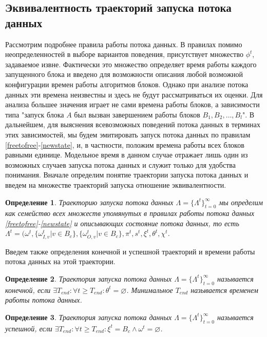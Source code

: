 \documentclass[10pt,a4paper]{article}
\newtheorem{defen}{Определение}
\begin{document}
\subsection{Эквивалентность траекторий запуска потока данных}
  Рассмотрим подробнее правила работы потока данных. В правилах помимо неопределенностей в выборе вариантов поведения, присутствует множество $\phi^t$, задаваемое извне.
  Фактически это множество определяет время работы каждого запущенного блока и введено для возможности описания любой возможной конфигурации времен работы алгоритмов блоков.
  Однако при анализе потока данных эти времена неизвестны и здесь не будут рассматриваться их оценки. Для анализа большее значения играет не сами времена работы блоков, а
  зависимости типа "запуск блока $A$ был вызван завершением работы блоков $B_1, B_2, \dots, B_l$".
  В дальнейшем, для выяснения всевозможных поведений потока данных в терминах этих зависимостей,
  мы будем эмитировать запуск потока данных по правилам \eqref{freetofree}-\eqref{newstate}, и, в частности, положим времена работы всех блоков равными единице.
  Модельное время в данном случае отражает лишь один из возможных случаев запуска потока данных и служит только для удобства понимания.
  Вначале определим понятие траектории запуска потока данных и введем на множестве траекторий запуска отношение эквивалентности.
  
  \begin{defen}
    Траекторию запуска потока данных $\Lambda = \{\Lambda^t\}_{t=0}^{\infty}$ мы определим как семейство всех множеств упомянутых в
    правилах работы потока данных \eqref{freetofree}-\eqref{newstate} и описывающих состояние потока данных,
    то есть $\Lambda^t = (\omega^t, \{\omega^t_{I, v} \vert v \in B_c\}, \{\omega^t_{O, v} \vert v \in B_c\}, \pi^t, s^t, \xi^t, \theta^t, \chi^t$.
  \end{defen}
  
  Введем также определения конечной и успешной траекторий и времени работы потока данных на этой траектории.
  \begin{defen}
    Траектория запуска потока данных $\Lambda = \{\Lambda^t\}_{t=0}^{\infty}$ называется конечной, если
    $\exists T_{end}: \forall t \geq T_{end}: \theta^t = \varnothing$. Минимальное $T_{end}$ называется временем работы потока данных.
    \label{def:trajectory_finite}
  \end{defen}
  
  \begin{defen}
    Траектория запуска потока данных $\Lambda = \{\Lambda^t\}_{t=0}^{\infty}$ называется успешной, если
    $\exists T_{end}: \forall t \geq T_{end} : \xi^t = B_c \wedge \omega^t = \varnothing$.
    \label{def:trajectory_success}
  \end{defen}
  
\end{document}
